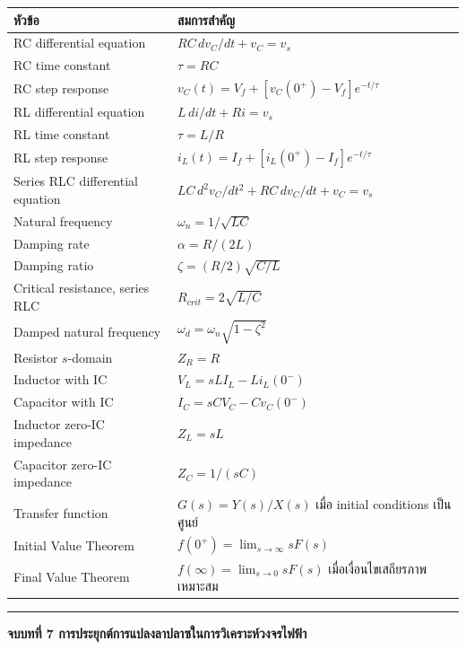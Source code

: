\begin{table}[htbp]
    \centering
    \begin{tabular}{l l}
        \hline
        \textbf{หัวข้อ} & \textbf{สมการสำคัญ} \\
        \hline
        RC differential equation & $RC\,dv_C/dt+v_C=v_s$ \\
        RC time constant & $\tau=RC$ \\
        RC step response & $v_C(t)=V_f+[v_C(0^+)-V_f]e^{-t/\tau}$ \\
        RL differential equation & $L\,di/dt+Ri=v_s$ \\
        RL time constant & $\tau=L/R$ \\
        RL step response & $i_L(t)=I_f+[i_L(0^+)-I_f]e^{-t/\tau}$ \\
        Series RLC differential equation & $LC\,d^2v_C/dt^2+RC\,dv_C/dt+v_C=v_s$ \\
        Natural frequency & $\omega_n=1/\sqrt{LC}$ \\
        Damping rate & $\alpha=R/(2L)$ \\
        Damping ratio & $\zeta=(R/2)\sqrt{C/L}$ \\
        Critical resistance, series RLC & $R_{crit}=2\sqrt{L/C}$ \\
        Damped natural frequency & $\omega_d=\omega_n\sqrt{1-\zeta^2}$ \\
        Resistor $s$-domain & $Z_R=R$ \\
        Inductor with IC & $V_L=sLI_L-Li_L(0^-)$ \\
        Capacitor with IC & $I_C=sCV_C-Cv_C(0^-)$ \\
        Inductor zero-IC impedance & $Z_L=sL$ \\
        Capacitor zero-IC impedance & $Z_C=1/(sC)$ \\
        Transfer function & $G(s)=Y(s)/X(s)$ เมื่อ initial conditions เป็นศูนย์ \\
        Initial Value Theorem & $f(0^+)=\lim_{s\to\infty}sF(s)$ \\
        Final Value Theorem & $f(\infty)=\lim_{s\to0}sF(s)$ เมื่อเงื่อนไขเสถียรภาพเหมาะสม \\
        \hline
    \end{tabular}
\end{table}

\par\noindent\rule{\textwidth}{0.4pt}\par

\textbf{จบบทที่ 7 การประยุกต์การแปลงลาปลาซในการวิเคราะห์วงจรไฟฟ้า}
